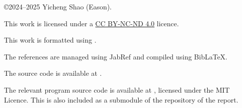 \noindent \copyright 2024--2025 Yicheng Shao (Eason).\nocite{*}

\noindent This work is licensed under a \href{https://creativecommons.org/licenses/by-nc-nd/4.0/}{CC BY-NC-ND 4.0} licence.

\noindent This work is formatted using \XeLaTeX.

\noindent The references are managed using JabRef \autocite{soft-jabref} and compiled using Bib\LaTeX.

\noindent The source code is available at .

\noindent The relevant program source code is available at , licensed under the MIT Licence. This is also included as a submodule of the repository of the report.